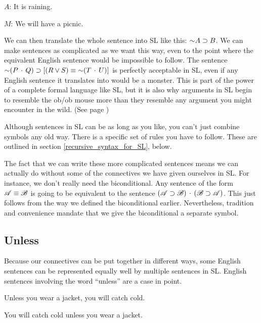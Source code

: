 \begin{ekey}
\item[$A$:] It is raining.
\item[$M$:] We will have a picnic.
\end{ekey}

We can then translate the whole sentence into SL like this: $\mathord{\sim} A \supset B$. We can make sentences as complicated as we want this way, even to the point where the equivalent English sentence would be impossible to follow. The sentence $\mathord{\sim} (P \,\cdot\, Q) \supset  [(R \vee S) \equiv \mathord{\sim} (T \,\cdot\, U)]$ is perfectly acceptable in SL, even if any English sentence it translates into would be a monster. This is part of the power of a complete formal language like SL, but it is also why arguments in SL begin to resemble the ob/ob mouse more than they resemble any argument you might encounter in the wild. (See page \pageref{fig:ob_ob_mouse}) 

Although sentences in SL can be as long as you like, you can't just combine symbols any old way. There is a specific set of rules you have to follow. These are outlined in section \ref{recursive_syntax_for_SL}, below.

The fact that we can write these more complicated sentences means we can actually do without some of the connectives we have given ourselves in SL. For instance, we don't really need the biconditional. Any sentence of the form $\mathscr{A} \equiv \mathscr{B}$ is going to be equivalent to the sentence $(\mathscr{A} \supset \mathscr{B}) \,\cdot\, (\mathscr{B} \supset \mathscr{A})$. This just follows from the way we defined the biconditional earlier. Nevertheless, tradition and convenience mandate that we give the biconditional a separate symbol.

\subsection{Unless}

Because our connectives can be put together in different ways, some English sentences can be represented equally well by multiple sentences in SL. English sentences involving the word ``unless'' are a case in point. 

\begin{earg}
\item[\ex{unless1}] Unless you wear a jacket, you will catch cold. 
\item[\ex{unless2}] You will catch cold unless you wear a jacket. 
\end{earg}

